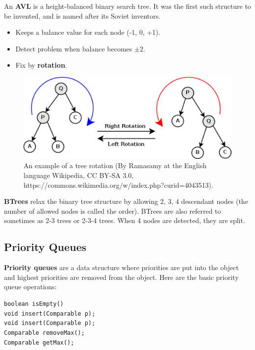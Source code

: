 An \textbf{AVL} is a height-balanced binary search tree. It was the first such structure to be invented, and is named after its Soviet inventors. 
\begin{itemize}
	\item Keeps a balance value for each node (-1, 0, +1).
	\item Detect problem when balance becomes $\pm 2$. 
	\item Fix by \textbf{rotation}. 
\end{itemize}

\begin{figure}[tb]
\centering
\includegraphics[width=0.75\columnwidth]{Figures/Tree_rotation.pdf}
\caption{An example of a tree rotation (By Ramasamy at the English language Wikipedia, CC BY-SA 3.0, https://commons.wikimedia.org/w/index.php?curid=4043513).}
\label{fig:rotation}
\end{figure}

\textbf{BTrees} relax the binary tree structure by allowing 2, 3, 4 descendant nodes (the number of allowed nodes is called the order). BTrees are also referred to sometimes as 2-3 trees or 2-3-4 trees. When 4 nodes are detected, they are split. 

\subsection{Priority Queues}

\textbf{Priority queues} are a data structure where priorities are put into the object and highest priorities are removed from the object. Here are the basic priority queue operations:

\indent \indent \texttt{boolean isEmpty()} \\
\indent \indent \texttt{void insert(Comparable p);} \\
\indent \indent \texttt{void insert(Comparable p);} \\
\indent \indent \texttt{Comparable removeMax();} \\
\indent \indent \texttt{Comparable getMax();} \\


